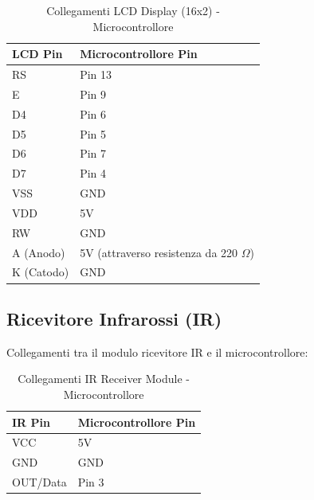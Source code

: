 \documentclass[a4paper, 12pt]{article}
\begin{document}
\begin{table}[H]
	\centering
	\caption{Collegamenti LCD Display (16x2) - Microcontrollore}
	\label{tab:lcd-16x2-connections}
	\begin{tabular}{ll}
		\toprule
		\textbf{LCD Pin} & \textbf{Microcontrollore Pin}                \\
		\midrule
		RS               & Pin 13                                       \\
		E                & Pin 9                                        \\
		D4               & Pin 6                                        \\
		D5               & Pin 5                                        \\
		D6               & Pin 7                                        \\
		D7               & Pin 4                                        \\
		VSS              & GND                                          \\
		VDD              & 5V                                           \\
		RW               & GND                                          \\
		A (Anodo)        & 5V (attraverso resistenza da 220 \(\Omega\)) \\
		K (Catodo)       & GND                                          \\
		\bottomrule
	\end{tabular}
\end{table}

\subsection{Ricevitore Infrarossi (IR)}
\label{subsec:setup-ir}
Collegamenti tra il modulo ricevitore IR e il microcontrollore:

\begin{table}[H]
	\centering
	\caption{Collegamenti IR Receiver Module - Microcontrollore}
	\label{tab:ir-receiver-connections}
	\begin{tabular}{ll}
		\toprule
		\textbf{IR Pin} & \textbf{Microcontrollore Pin} \\
		\midrule
		VCC             & 5V                            \\
		GND             & GND                           \\
		OUT/Data        & Pin 3                         \\
		\bottomrule
	\end{tabular}
\end{table}
\end{document}
